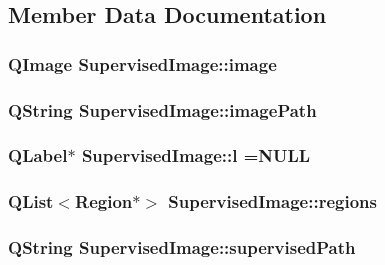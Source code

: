 \subsection{Member Data Documentation}
\hypertarget{class_supervised_image_a0641d3087990ef954a6d5e88e927bbc5}{
\subsubsection[{image}]{\setlength{\rightskip}{0pt plus 5cm}Q\+Image Supervised\+Image\+::image\hspace{0.3cm}{\ttfamily [private]}}}\label{class_supervised_image_a0641d3087990ef954a6d5e88e927bbc5}
\hypertarget{class_supervised_image_a39f8b0212d2dae489d7b060b0d8dd1b9}{
\subsubsection[{image\+Path}]{\setlength{\rightskip}{0pt plus 5cm}Q\+String Supervised\+Image\+::image\+Path\hspace{0.3cm}{\ttfamily [private]}}}\label{class_supervised_image_a39f8b0212d2dae489d7b060b0d8dd1b9}
\hypertarget{class_supervised_image_a2f1fcadc1267a86ad9d6469b0b2d11b5}{
\subsubsection[{l}]{\setlength{\rightskip}{0pt plus 5cm}Q\+Label$\ast$ Supervised\+Image\+::l =N\+U\+L\+L\hspace{0.3cm}{\ttfamily [private]}}}\label{class_supervised_image_a2f1fcadc1267a86ad9d6469b0b2d11b5}
\hypertarget{class_supervised_image_a264d8baa97fa79247b310a94e160e7fb}{
\subsubsection[{regions}]{\setlength{\rightskip}{0pt plus 5cm}Q\+List$<${\bf Region}$\ast$$>$ Supervised\+Image\+::regions\hspace{0.3cm}{\ttfamily [private]}}}\label{class_supervised_image_a264d8baa97fa79247b310a94e160e7fb}
\hypertarget{class_supervised_image_aeeb634f3804dffba600e6aea71fc353e}{
\subsubsection[{supervised\+Path}]{\setlength{\rightskip}{0pt plus 5cm}Q\+String Supervised\+Image\+::supervised\+Path\hspace{0.3cm}{\ttfamily [private]}}}\label{class_supervised_image_aeeb634f3804dffba600e6aea71fc353e}


